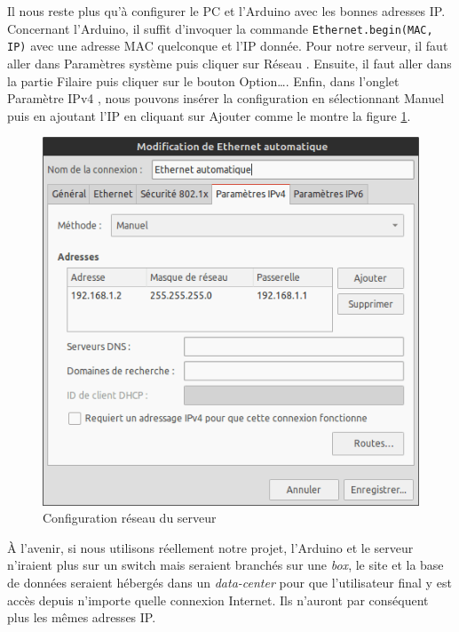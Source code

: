 Il nous reste plus qu'à configurer le PC et l'Arduino avec les bonnes adresses IP. Concernant l'Arduino, il suffit d'invoquer la commande \verb-Ethernet.begin(MAC, IP)- avec une adresse MAC quelconque et l'IP donnée. Pour notre serveur, il faut aller dans \og Paramètres système \fg{} puis cliquer sur \og Réseau \fg. Ensuite, il faut aller dans la partie \og Filaire \fg{} puis cliquer sur le bouton \og Option\dots \fg. Enfin, dans l'onglet \og Paramètre IPv4 \fg, nous pouvons insérer la configuration en sélectionnant \og Manuel \fg{} puis en ajoutant l'IP en cliquant sur \og Ajouter \fg{} comme le montre la figure \ref{fig:configuration-reseau}.

\begin{figure}[!h]
	\centering
	\includegraphics[width=.5\linewidth]{Images/Parametres_reseau_Linux}
	\caption{Configuration réseau du serveur}
	\label{fig:configuration-reseau}
\end{figure}

À l'avenir, si nous utilisons réellement notre projet, l'Arduino et le serveur n'iraient plus sur un switch mais seraient branchés sur une \emph{box}, le site et la base de données seraient hébergés dans un \emph{data-center} pour que l'utilisateur final y est accès depuis n'importe quelle connexion Internet. Ils n'auront par conséquent plus les mêmes adresses IP.

